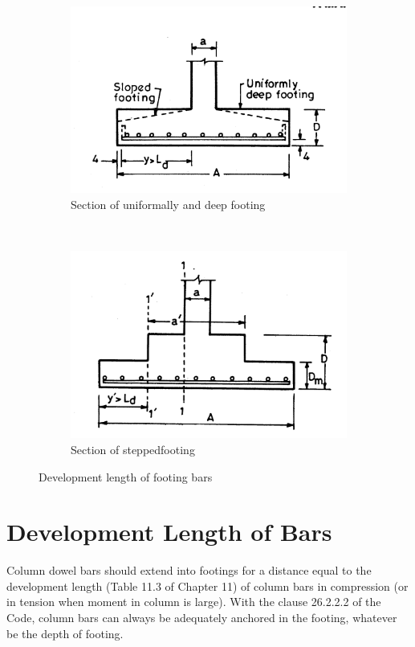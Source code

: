 \documentclass{report}
\begin{document}
\begin{figure}[h]
  \centering
  \begin{subfigure}[b]{0.5\textwidth}
    \includegraphics[width=\textwidth]{images/fig2341.png}
    \caption{Section of uniformally and deep footing}
    \label{fig:1}
  \end{subfigure}\\
  \begin{subfigure}[b]{0.5\textwidth}
    \includegraphics[width=\textwidth]{images/fig2342.png}
    \caption{Section of steppedfooting}
    \label{fig:2}
  \end{subfigure}
\caption{Development length of footing bars}
\end{figure}

\section{Development Length of Bars}
Column dowel bars should extend into footings for a distance equal to the development
length (Table 11.3 of Chapter 11) of column bars in compression (or in tension when moment in column is large). With the clause 26.2.2.2 of the Code, column bars can always be adequately anchored in the footing, whatever be the depth of footing. 
\end{document}
